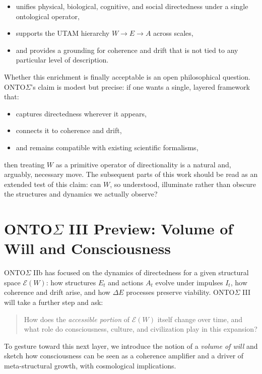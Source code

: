 \documentclass[12pt,a4paper]{report}
\newcommand{\Will}{W}
\begin{document}
\begin{itemize}[leftmargin=2em]
    \item unifies physical, biological, cognitive, and social directedness under a single ontological operator,
    \item supports the UTAM hierarchy \(W \to E \to A\) across scales,
    \item and provides a grounding for coherence and drift that is not tied to any particular level of description.
\end{itemize}

Whether this enrichment is finally acceptable is an open philosophical question. ONTO$\Sigma$’s claim is modest but precise: if one wants a single, layered framework that:

\begin{itemize}[leftmargin=2em]
    \item captures directedness wherever it appears,
    \item connects it to coherence and drift,
    \item and remains compatible with existing scientific formalisms,
\end{itemize}

then treating \(\Will\) as a primitive operator of directionality is a natural and, arguably, necessary move. The subsequent parts of this work should be read as an extended test of this claim: can \(\Will\), so understood, illuminate rather than obscure the structures and dynamics we actually observe?


\chapter{ONTO$\Sigma$ III Preview: Volume of Will and Consciousness}

ONTO$\Sigma$ IIb has focused on the dynamics of directedness for a given structural space \(\mathcal{E}(\Will)\): how structures \(E_t\) and actions \(A_t\) evolve under impulses \(I_t\), how coherence and drift arise, and how $\Delta E$ processes preserve viability. ONTO$\Sigma$ III will take a further step and ask:

\begin{quote}
How does the \emph{accessible portion} of \(\mathcal{E}(\Will)\) itself change over time, and what role do consciousness, culture, and civilization play in this expansion?
\end{quote}

To gesture toward this next layer, we introduce the notion of a \emph{volume of will} and sketch how consciousness can be seen as a coherence amplifier and a driver of meta-structural growth, with cosmological implications.
\end{document}

